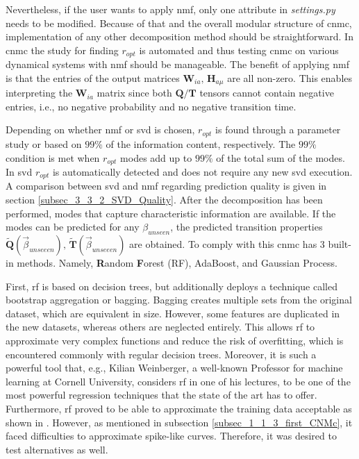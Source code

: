 Nevertheless, if the user wants to apply \gls{nmf}, only one attribute in \emph{settings.py} needs to be modified.
Because of that and the overall modular structure of \gls{cnmc}, implementation of any other decomposition method should be straightforward.
In \gls{cnmc} the study for finding $r_{opt}$ is automated and thus testing \gls{cnmc} on various dynamical systems with \gls{nmf} should be manageable. 
The benefit of applying \gls{nmf} is that the entries of the output matrices $\bm W_{ia},\, \bm H_{a \mu}$ are all non-zero.
This enables interpreting the $\bm W_{ia}$ matrix since both $\bm Q / \bm T$ tensors cannot contain negative entries, i.e., no negative probability and no negative transition time.\newline

Depending on whether  \gls{nmf} or \gls{svd} is chosen, $r_{opt}$ is found through a parameter study or based on $99 \%$ of the information content, respectively.
The $99 \%$ condition is met when $r_{opt}$ modes add up to $99 \%$ of the total sum of the modes. In \gls{svd} $r_{opt}$ is automatically detected and does not require any new \gls{svd} execution. A comparison between \gls{svd} and \gls{nmf} regarding prediction quality is given in 
section
\ref{subsec_3_3_2_SVD_Quality}.
After the decomposition has been performed, modes that capture characteristic information are available. 
If the modes can be predicted for any $\beta_{unseen}$, the predicted transition properties $\bm{\tilde{Q}}(\vec{\beta}_{unseeen}) ,\, \bm{\tilde{T}}(\vec{\beta}_{unseeen})$ are obtained. 
To comply with this \gls{cnmc} has 3 built-in methods. 
Namely, \textbf{R}andom \textbf{F}orest (RF), AdaBoost, and Gaussian Process.\newline 

First, \gls{rf} is based on decision trees, but additionally deploys
a technique called bootstrap aggregation or bagging. 
Bagging creates multiple sets from the original dataset, which are equivalent in size. 
However, some features are duplicated in the new datasets, whereas others are 
neglected entirely. This allows \gls{rf} to approximate very complex functions 
and reduce the risk of overfitting, which is encountered commonly 
with regular decision trees. 
Moreover, it is such a powerful tool
that, e.g., Kilian Weinberger, a well-known Professor for machine learning 
at Cornell University, considers \gls{rf} in one of his lectures, to be 
one of the most powerful regression techniques that the state of the art has to offer.
Furthermore, \gls{rf} proved to be able to approximate the training data  
acceptable as shown in \cite{Max2021}. 
However, as mentioned in subsection \ref{subsec_1_1_3_first_CNMc}, it faced difficulties to approximate spike-like curves. 
Therefore, it was desired to test alternatives as well.\newline

